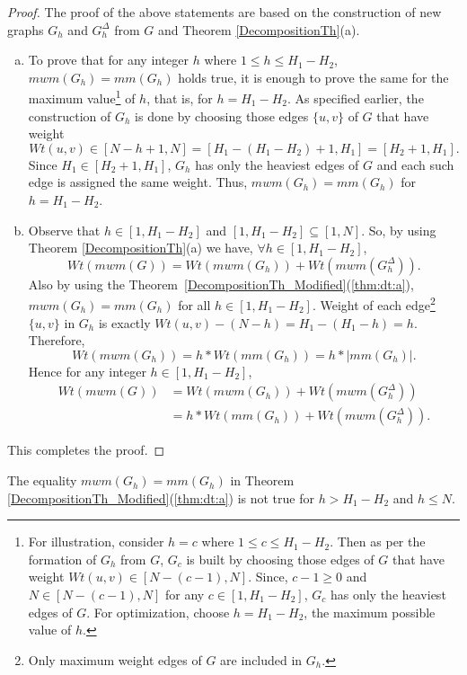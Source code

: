 \documentclass[runningheads,a4paper]{llncs}
\begin{document}
\begin{proof}
The proof of the above statements are based on the construction of new
graphs $G_h$ and $G_h^\Delta$ from $G$ and Theorem \ref{DecompositionTh}(a).
\begin{enumerate}[(a)]
\item To prove that for any integer $h$ where $1 \leq h \leq H_1-H_2$,
$\textit{mwm}(G_h)=\textit{mm}(G_h)$ holds true, it is enough to prove the
same for the maximum value\footnote{
For illustration,
consider $h=c$ where $1 \leq c \leq H_1-H_2$. Then as per the
formation of $G_h$ from $G$, $G_c$ is built by choosing those edges
of $G$ that have weight $\textit{Wt}(u,v) \in [N-(c-1),N]$. Since, $c-1 \geq 0$
and $N \in [N-(c-1),N]$ for any $c \in [1, H_1-H_2]$, $G_c$ has only
the heaviest edges of $G$. For optimization, choose $h=H_1-H_2$,
the maximum possible value of $h$.} of
$h$, that is, for $h=H_1-H_2$. As specified earlier, the
construction of $G_h$ is done by choosing those edges $\{u,v\}$ of $G$ that have weight 
$$\textit{Wt}(u,v) \in [N-h+1,N]=[H_1-(H_1-H_2)+1, H_1]=[H_2+1,H_1].$$
Since $H_1 \in [H_2+1, H_1]$, $G_h$ has only the heaviest edges of
$G$ and each such edge is assigned the same weight.
Thus, $\textit{mwm}(G_h)=\textit{mm}(G_h)$ for $h=H_1-H_2$.

\item Observe that $h \in[1,H_1-H_2]$ and $[1,H_1-H_2]\subseteq [1,N]$.
So, by using Theorem \ref{DecompositionTh}(a) we have, $\forall h \in[1,H_1-H_2]$,
$$\textit{Wt}(\textit{mwm}(G))= \textit{Wt}(\textit{mwm}(G_h))+\textit{Wt}(\textit{mwm}(G_h^\Delta)).$$
Also by using the Theorem~\ref{DecompositionTh_Modified}(\ref{thm:dt:a}),
$\textit{mwm}(G_h)=\textit{mm}(G_h)$ for all $h \in [1,H_1-H_2]$.
Weight of each edge\footnote{Only maximum weight edges of $G$ are included in $G_h$.} $\{u,v\}$ in $G_h$ is exactly $\textit{Wt}(u,v)-(N-h) =
H_1-(H_1-h) = h$. Therefore,
\[\textit{Wt}(\textit{mwm}(G_h))=h * \textit{Wt}(\textit{mm}(G_h))= h * |\textit{mm}(G_h)|.\]
Hence for any integer $h \in [1,H_1-H_2]$, 
\begin{align*}
  \textit{Wt}(\textit{mwm}(G)) &= \textit{Wt}(\textit{mwm}(G_h))+ \textit{Wt}(\textit{mwm}(G_h^\Delta))\\[2pt]
			 & = h * \textit{Wt}(\textit{mm}(G_h))+ \textit{Wt}(\textit{mwm}(G_h^\Delta)).\end{align*}
\end{enumerate}
This completes the proof.
\end{proof}

\begin{remark}
The equality $\textit{mwm}(G_h)=\textit{mm}(G_h)$ in Theorem
\ref{DecompositionTh_Modified}(\ref{thm:dt:a}) is not true for
$h > H_1-H_2$ and $h \leq N$.
\end{remark}
\end{document}
